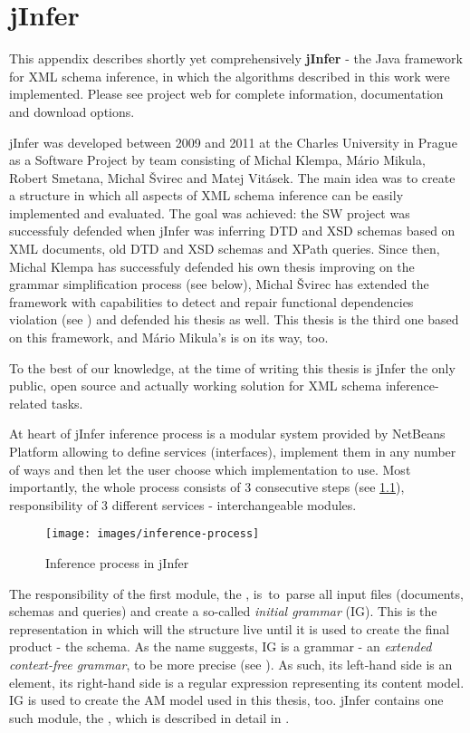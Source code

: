 \chapter{jInfer}
\label{appendix-jInfer}

This appendix describes shortly yet comprehensively \textbf{jInfer} - the Java framework for XML schema inference, in which the algorithms described in this work were implemented. Please see project web \cite{jinferweb} for complete information, documentation and download options.

jInfer was developed between 2009 and 2011 at the Charles University in Prague as a Software Project by team consisting of Michal Klempa, Mário Mikula, Ro\-bert Sme\-ta\-na, Michal Švirec and Matej Vitásek. The main idea was to create a structure in which all aspects of XML schema inference can be easily implemented and evaluated. The goal was achieved: the SW project was successfuly defended when jInfer was inferring DTD and XSD schemas based on XML documents, old DTD and XSD schemas and XPath queries. Since then, Michal Klempa has successfuly defended his own thesis improving on the grammar simplification process (see below), Michal Švirec has extended the framework with capabilities to detect and repair functional dependencies violation (see \cite{sviro}) and defended his thesis as well. This thesis is the third one based on this framework, and Mário Mikula's is on its way, too.

To the best of our knowledge, at the time of writing this thesis is jInfer the only public, open source and actually working solution for XML schema inference-related tasks.

At heart of jInfer inference process is a modular system provided by NetBeans Platform allowing to define services (interfaces), implement them in any number of ways and then let the user choose which implementation to use. Most importantly, the whole process consists of 3 consecutive steps (see \ref{image-inference-process}), responsibility of 3 different services - interchangeable modules.

\begin{figure}
  \caption{Inference process in jInfer}
  \vspace{10pt}
  \label{image-inference-process}
  \centering
    \texttt{[image: images/inference-process]}
\end{figure}

The responsibility of the first module, the , is~to~parse all input files (documents, schemas and queries) and create a so-called \textit{initial grammar} (IG). 
This is the representation in which will the structure live until it is used to create the final product - the schema. As the name suggests, IG is a grammar - an \textit{extended context-free grammar}, to be more precise (see \cite{extendedcfg}). As such, its left-hand side is an element, its right-hand side is a regular expression representing its content model. IG is used to create the AM model used in this thesis, too. jInfer contains one such module, the , which is described in detail in \cite{basiciggdoc}.

